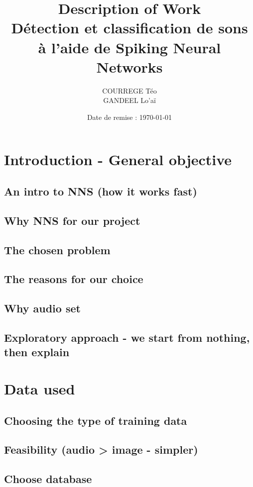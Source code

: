 \documentclass{article}
\title{
    \vspace{2cm}
    \textbf{\Huge Description of Work}\\
    \vspace{1cm}
    \Large Détection et classification de sons\\à l'aide de Spiking Neural Networks
    \vspace{2cm}
}
\author{
    COURREGE Téo\\
    GANDEEL Lo'aï\\}
\date{\vspace{2cm}\Large Date de remise : \today}
\begin{document}
\maketitle

\newpage

\tableofcontents


\section{Introduction - General objective}
    \subsection{An intro to NNS (how it works fast)}
    \subsection{Why NNS for our project}
    \subsection{The chosen problem}
    \subsection{The reasons for our choice}
    \subsection{Why audio set}
    \subsection{Exploratory approach - we start from nothing, then explain}

\section{Data used}
    \subsection{Choosing the type of training data}
        \subsection{Feasibility (audio > image - simpler)}
    \subsection{Choose database}
\end{document}

